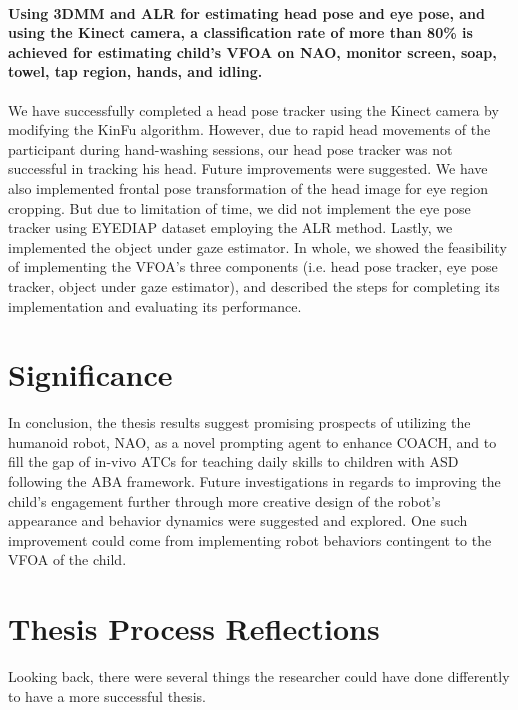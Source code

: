 \paragraph{Using 3DMM and ALR for estimating head pose and eye pose, and using the Kinect camera, a classification rate of more than 80\% is achieved for estimating child's VFOA on NAO, monitor screen, soap, towel, tap region, hands, and idling.}
We have successfully completed a head pose tracker using the Kinect camera by modifying the KinFu algorithm.  However, due to rapid head movements of the participant during hand-washing sessions, our head pose tracker was not successful in tracking his head.  Future improvements were suggested.  We have also implemented frontal pose transformation of the head image for eye region cropping.  But due to limitation of time, we did not implement the eye pose tracker using EYEDIAP dataset employing the ALR method.  Lastly, we implemented the object under gaze estimator.  In whole, we showed the feasibility of implementing the VFOA's three components (i.e. head pose tracker, eye pose tracker, object under gaze estimator), and described the steps for completing its implementation and evaluating its performance.

\section{Significance}
In conclusion, the thesis results suggest promising prospects of utilizing the humanoid robot, NAO, as a novel prompting agent to enhance COACH, and to fill the gap of in-vivo ATCs for teaching daily skills to children with ASD following the ABA framework.  Future investigations in regards to improving the child's engagement further through more creative design of the robot's appearance and behavior dynamics were suggested and explored.  One such improvement could come from implementing robot behaviors contingent to the VFOA of the child.

\section{Thesis Process Reflections}
Looking back, there were several things the researcher could have done differently to have a more successful thesis.

